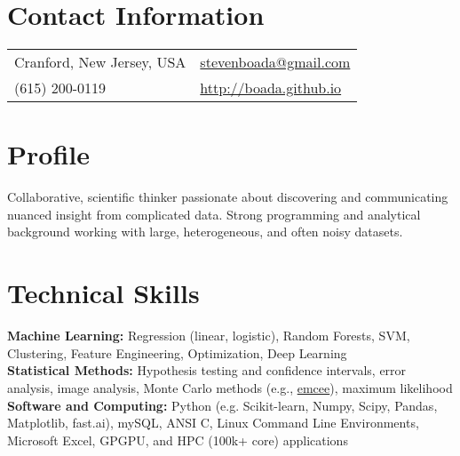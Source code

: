 \documentclass[margin,line, 11pt]{res}
\begin{document}

\begin{resume}
\vspace*{-2mm}
\section{Contact Information}
\begin{tabular}{@{}p{3in}p{3in}}
Cranford, New Jersey, USA & \href{mailto:stevenboada@gmail.com}{stevenboada@gmail.com} \\
(615) 200-0119   & \url{http://boada.github.io} \\
\end{tabular}
\vspace*{-4mm}

\section{Profile}
Collaborative, scientific thinker passionate about discovering and communicating nuanced insight from complicated data. Strong programming and analytical background working with large, heterogeneous, and often noisy datasets.
\vspace*{-2.5mm}

\section{Technical Skills}
\textbf{Machine Learning:} Regression (linear, logistic), Random Forests, SVM, Clustering, Feature Engineering, Optimization, Deep Learning\\
\textbf{Statistical Methods:} Hypothesis testing and confidence intervals, error analysis, image analysis, Monte Carlo methods (e.g., \href{https://github.com/dfm/emcee}{emcee}), maximum likelihood\\
\textbf{Software and Computing:}  Python (e.g. Scikit-learn, Numpy, Scipy, Pandas, Matplotlib, fast.ai), mySQL, ANSI C, Linux Command Line Environments, Microsoft Excel, GPGPU, and HPC (100k+ core) applications\\
\vspace*{-8mm}


\end{resume}
\end{document}
